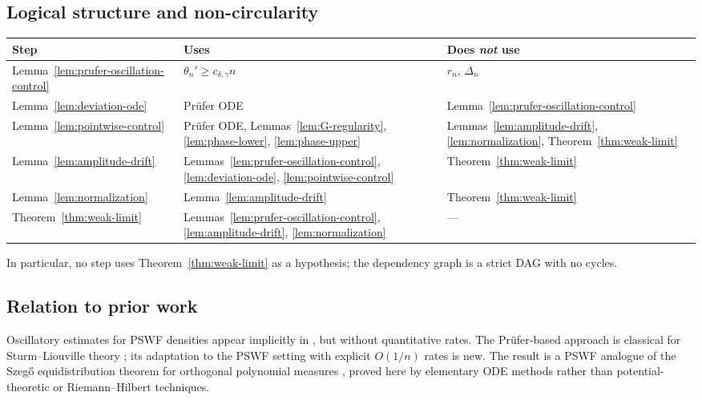 \documentclass[12pt,a4paper]{amsart}
\begin{document}
\subsection{Logical structure and non-circularity}

\begin{center}
\begin{tabular}{lll}
\hline
Step & Uses & Does \emph{not} use \\
\hline
Lemma~\ref{lem:prufer-oscillation-control} &
  $\theta_n' \ge c_{\delta,\gamma}n$ &
  $r_n$, $\Delta_n$ \\
Lemma~\ref{lem:deviation-ode} &
  Pr\"ufer ODE &
  Lemma~\ref{lem:prufer-oscillation-control} \\
Lemma~\ref{lem:pointwise-control} &
  Pr\"ufer ODE,
  Lemmas~\ref{lem:G-regularity}, \ref{lem:phase-lower},
  \ref{lem:phase-upper} &
  Lemmas~\ref{lem:amplitude-drift},
  \ref{lem:normalization},
  Theorem~\ref{thm:weak-limit} \\
Lemma~\ref{lem:amplitude-drift} &
  Lemmas~\ref{lem:prufer-oscillation-control},
  \ref{lem:deviation-ode},
  \ref{lem:pointwise-control} &
  Theorem~\ref{thm:weak-limit} \\
Lemma~\ref{lem:normalization} &
  Lemma~\ref{lem:amplitude-drift} &
  Theorem~\ref{thm:weak-limit} \\
Theorem~\ref{thm:weak-limit} &
  Lemmas~\ref{lem:prufer-oscillation-control},
  \ref{lem:amplitude-drift},
  \ref{lem:normalization} &
  --- \\
\hline
\end{tabular}
\end{center}

\noindent
In particular, no step uses Theorem~\ref{thm:weak-limit} as a
hypothesis; the dependency graph is a strict DAG with no cycles.

\subsection{Relation to prior work}

Oscillatory estimates for PSWF densities appear implicitly in
\cite{OsipovRokhlinXiao}, but without quantitative rates.
The Pr\"ufer-based approach is classical for Sturm--Liouville
theory \cite{Levitan}; its adaptation to the PSWF setting
with explicit $O(1/n)$ rates is new.
The result is a PSWF analogue of the Szeg\H{o} equidistribution
theorem for orthogonal polynomial measures \cite{Szego},
proved here by elementary ODE methods rather than
potential-theoretic or Riemann--Hilbert techniques.
\end{document}
